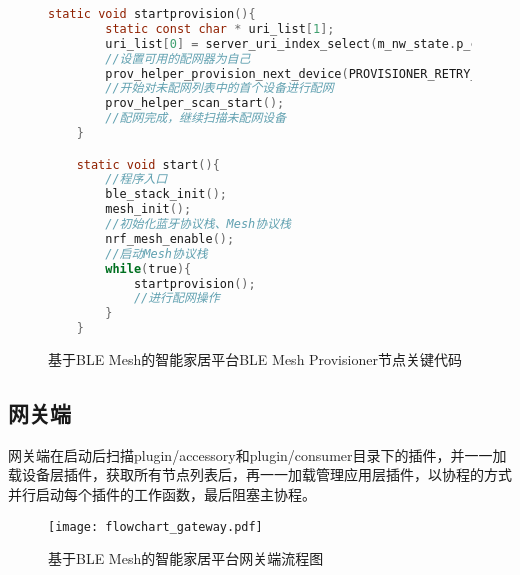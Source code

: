 \begin{figure}[H]
    \centering
    \begin{lstlisting}[language=C]
    static void startprovision(){
        static const char * uri_list[1];
        uri_list[0] = server_uri_index_select(m_nw_state.p_client_uri);
        //设置可用的配网器为自己
        prov_helper_provision_next_device(PROVISIONER_RETRY_COUNT, m_nw_state.next_device_address, uri_list, ARRAY_SIZE(uri_list));
        //开始对未配网列表中的首个设备进行配网
        prov_helper_scan_start();
        //配网完成，继续扫描未配网设备
    }

    static void start(){
        //程序入口
        ble_stack_init();
        mesh_init();
        //初始化蓝牙协议栈、Mesh协议栈
        nrf_mesh_enable();
        //启动Mesh协议栈
        while(true){
            startprovision();
            //进行配网操作
        }
    }
    \end{lstlisting}
    \caption{基于BLE Mesh的智能家居平台BLE Mesh Provisioner节点关键代码}
    \label{fig:code_mesh_provisioner}
\end{figure}

\subsection{网关端}
网关端在启动后扫描plugin/accessory和plugin/consumer目录下的插件，并一一加载设备层插件，获取所有节点列表后，再一一加载管理应用层插件，以协程的方式并行启动每个插件的工作函数，最后阻塞主协程。

\begin{figure}[H]
    \centering
    \texttt{[image: flowchart\_gateway.pdf]}
    \caption{基于BLE Mesh的智能家居平台网关端流程图}
    \label{fig:flowchart_gateway}
\end{figure}

